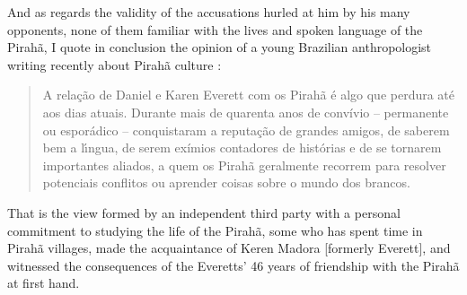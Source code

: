 \documentclass[output=paper,colorlinks,citecolor=brown
]{langscibook}
\begin{document}
And as regards the validity of the accusations hurled at him by his
many opponents, none of them familiar with the lives and spoken
language of the Pirah{\~a}, I quote in conclusion the opinion of a
young Brazilian anthropologist writing recently about Pirah{\~a}
culture \citep[59]{Felizes23}:
\begin{quote}
A rela{\c{c}}{\~a}o de Daniel e Karen Everett com os Pirah{\~a} {\'e}
algo que perdura at{\'e} aos dias atuais. Durante mais de quarenta
anos de convívio – permanente ou espor{\'a}dico – conquistaram a
reputa{\c{c}}{\~a}o de grandes amigos, de saberem bem a l{\'\i}ngua, de
serem exímios contadores de histórias e de se tornarem importantes
aliados, a quem os Pirah{\~a} geralmente recorrem para resolver
potenciais conflitos ou aprender coisas sobre o mundo dos brancos.

\end{quote}
That is the view formed by an independent third party with a personal
commitment to studying the life of the Pirah{\~a}, some who has spent time
in Pirah{\~a} villages, made the acquaintance of Keren Madora [formerly
Everett], and witnessed the consequences of the Everetts' 46 years of
friendship with the Pirah{\~a} at first hand.
\end{document}
